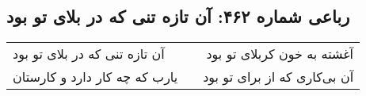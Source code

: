 \begin{center}
\section*{رباعی شماره ۴۶۲: آن تازه تنی که در بلای تو بود}
\label{sec:0462}
\begin{longtable}{l p{0.5cm} r}
آن تازه تنی که در بلای تو بود
&&
آغشته به خون کربلای تو بود
\\
یارب که چه کار دارد و کارستان
&&
آن بی‌کاری که از برای تو بود
\\
\end{longtable}
\end{center}
